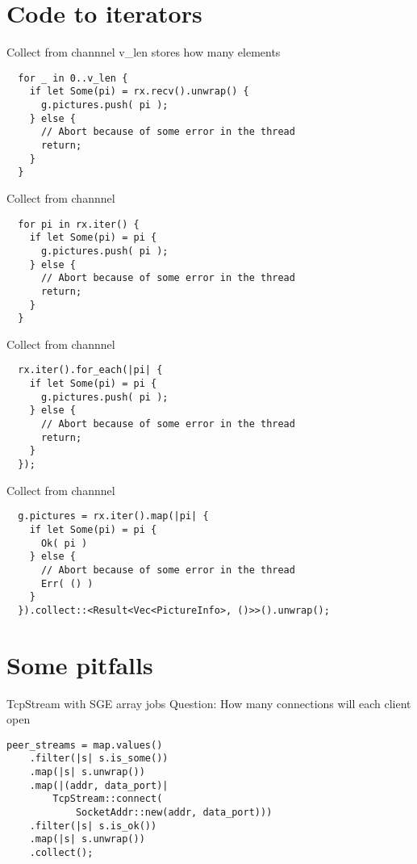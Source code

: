 \documentclass[aspectratio=1610,t]{beamer}
\begin{document}
{
\section{Code to iterators}
}
\begin{frame}[fragile]{Collect from channnel}
v\_len stores how many elements
\begin{verbatim}
  for _ in 0..v_len {
    if let Some(pi) = rx.recv().unwrap() {
      g.pictures.push( pi );
    } else {
      // Abort because of some error in the thread
      return;
    }
  }
\end{verbatim}
\end{frame}

\begin{frame}[fragile]{Collect from channnel}
\begin{verbatim}
  for pi in rx.iter() {
    if let Some(pi) = pi {
      g.pictures.push( pi );
    } else {
      // Abort because of some error in the thread
      return;
    }
  }
\end{verbatim}
\end{frame}

\begin{frame}[fragile]{Collect from channnel}
\begin{verbatim}
  rx.iter().for_each(|pi| {
    if let Some(pi) = pi {
      g.pictures.push( pi );
    } else {
      // Abort because of some error in the thread
      return;
    }
  });
\end{verbatim}
\end{frame}

\begin{frame}[fragile]{Collect from channnel}
\begin{verbatim}
  g.pictures = rx.iter().map(|pi| {
    if let Some(pi) = pi {
      Ok( pi )
    } else {
      // Abort because of some error in the thread
      Err( () )
    }
  }).collect::<Result<Vec<PictureInfo>, ()>>().unwrap();
\end{verbatim}
\end{frame}

{
\section{Some pitfalls}
}
\begin{frame}[fragile]{TcpStream with SGE array jobs}
Question: How many connections will each client open
\begin{verbatim}
peer_streams = map.values()
    .filter(|s| s.is_some())
    .map(|s| s.unwrap())
    .map(|(addr, data_port)|
        TcpStream::connect(
            SocketAddr::new(addr, data_port)))
    .filter(|s| s.is_ok())
    .map(|s| s.unwrap())
    .collect();
\end{verbatim}
\end{frame}
\end{document}
